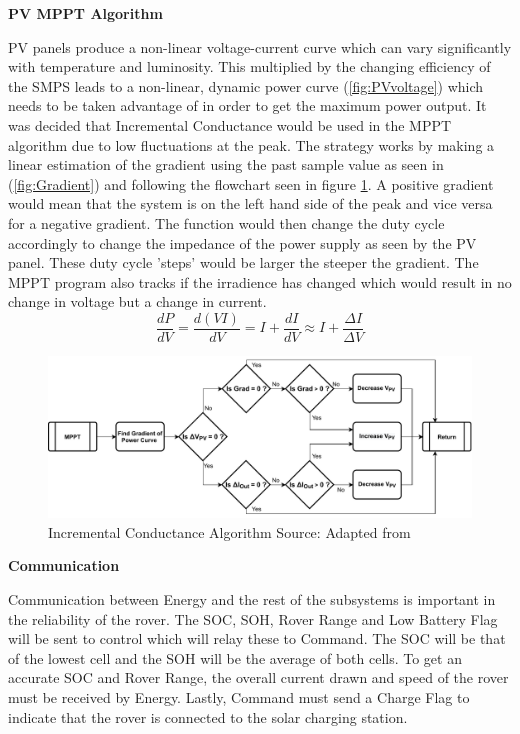 \documentclass[10pt,twoside]{article}
\begin{document}
\textbf{PV MPPT Algorithm}

PV panels produce a non-linear voltage-current curve which can vary significantly with temperature and luminosity. This multiplied by the changing efficiency of the SMPS leads to a non-linear, dynamic power curve (\ref{fig:PVvoltage}) which needs to be taken advantage of in order to get the maximum power output. It was decided that Incremental Conductance would be used in the MPPT algorithm due to low fluctuations at the peak. The strategy works by making a linear estimation of the gradient using the past sample value as seen in (\ref{fig:Gradient}) and following the flowchart seen in figure \ref{fig:IncrementalConductance}. A positive gradient would mean that the system is on the left hand side of the peak and vice versa for a negative gradient. The function would then change the duty cycle accordingly to change the impedance of the power supply as seen by the PV panel. These duty cycle 'steps' would be larger the steeper the gradient. The MPPT program also tracks if the irradience has changed which would result in no change in voltage but a change in current. 
\begin{equation}
    \frac{dP}{dV} = \frac{d(VI)}{dV} = I + \frac{dI}{dV} \approx I + \frac{\Delta I}{\Delta V}
    \label{fig:Gradient}
\end{equation}

\begin{figure}[hbt!]
    \centering
    \includegraphics[scale = 0.65]{IncrementalConductance2 (3).pdf}
    \caption{Incremental Conductance Algorithm \quad Source: Adapted from \cite{Choudhary2014IncrementalConverter}}
    \label{fig:IncrementalConductance}
\end{figure}

\textbf{Communication}

Communication between Energy and the rest of the subsystems is important in the reliability of the rover. The SOC, SOH, Rover Range and Low Battery Flag will be sent to control which will relay these to Command. The SOC will be that of the lowest cell and the SOH will be the average of both cells. To get an accurate SOC and Rover Range, the overall current drawn and speed of the rover must be received by Energy. Lastly, Command must send a Charge Flag to indicate that the rover is connected to the solar charging station. 
\end{document}
